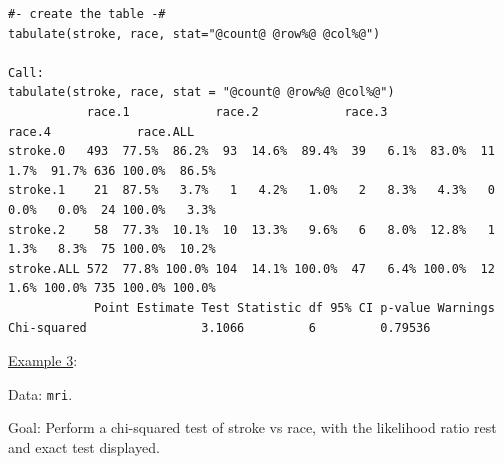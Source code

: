 \documentclass[11pt,letterpaper,fleqn]{report}
\begin{document}
\begin{enumerate}[]
{\begin{verbatim}
#- create the table -#
tabulate(stroke, race, stat="@count@ @row%@ @col%@")

Call:
tabulate(stroke, race, stat = "@count@ @row%@ @col%@")
           race.1            race.2            race.3            race.4            race.ALL         
stroke.0   493  77.5%  86.2%  93  14.6%  89.4%  39   6.1%  83.0%  11   1.7%  91.7% 636 100.0%  86.5%
stroke.1    21  87.5%   3.7%   1   4.2%   1.0%   2   8.3%   4.3%   0   0.0%   0.0%  24 100.0%   3.3%
stroke.2    58  77.3%  10.1%  10  13.3%   9.6%   6   8.0%  12.8%   1   1.3%   8.3%  75 100.0%  10.2%
stroke.ALL 572  77.8% 100.0% 104  14.1% 100.0%  47   6.4% 100.0%  12   1.6% 100.0% 735 100.0% 100.0%
            Point Estimate Test Statistic df 95% CI p-value Warnings
Chi-squared                3.1066         6         0.79536          

\end{verbatim}}

\end{enumerate}

\underline{Example 3}:

Data: \texttt{mri}.

Goal: Perform a chi-squared test of stroke vs race, with the likelihood ratio rest and exact test displayed.
\end{document}
